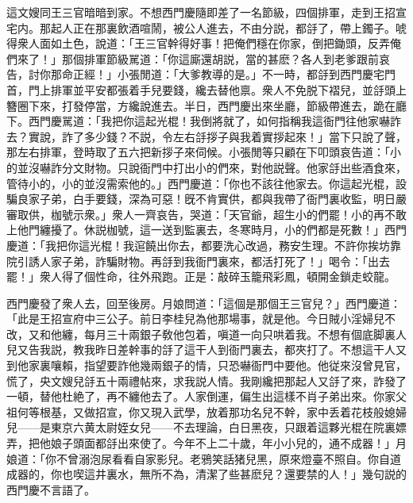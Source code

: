 這文嫂同王三官暗暗到家。不想西門慶隨即差了一名節級，四個排軍，走到王招宣宅内。那起人正在那裏飲酒喧鬧，被公人進去，不由分説，都㧱了，帶上鐲子。唬得衆人面如土色，說道：「王三官幹得好事！把俺們穩在你家，倒把鋤頭，反弄俺們來了！」那個排軍節級駡道：「你這廝還胡説，當的甚麽？各人到老爹跟前哀告，討你那命正經！」小張閒道：「大爹教導的是。」不一時，都㧱到西門慶宅門首，門上排軍並平安都張着手兒要錢，纔去替他禀。衆人不免脱下褶兒，並㧱頭上簪圈下來，打發停當，方纔說進去。半日，西門慶出來坐廳，節級帶進去，跪在廳下。西門慶駡道：「我把你這起光棍！我倒將就了，如何指稱我這衙門往他家嚇詐去？實說，詐了多少錢？不説，令左右㧱拶子與我着實拶起來！」當下只說了聲，那左右排軍，登時取了五六把新拶子來伺候。小張閒等只顧在下叩頭哀告道：「小的並沒嚇詐分文財物。只說衙門中打出小的們來，對他説聲。他家㧱出些酒食來，管待小的，小的並沒需索他的。」西門慶道：「你也不該往他家去。你這起光棍，設騙良家子弟，白手要錢，深為可惡！旣不肯實供，都與我帶了衙門裏收監，明日嚴審取供，枷號示衆。」衆人一齊哀告，哭道：「天官爺，超生小的們罷！小的再不敢上他門纏擾了。休説枷號，這一送到監裏去，冬寒時月，小的們都是死數！」西門慶道：「我把你這光棍！我逭饒出你去，都要洗心改過，務安生理。不許你挨坊靠院引誘人家子弟，詐騙財物。再㧱到我衙門裏來，都活打死了！」喝令：「出去罷！」衆人得了個性命，往外飛跑。正是：敲碎玉籠飛彩鳳，頓開金鎖走蛟龍。

西門慶發了衆人去，回至後房。月娘問道：「這個是那個王三官兒？」西門慶道：「此是王招宣府中三公子。前日李桂兒為他那場事，就是他。今日賊小淫婦兒不改，又和他纏，每月三十兩銀子敎他包着，嗔道一向只哄着我。不想有個底脚裏人兒又告我説，教我昨日差幹事的㧱了這干人到衙門裏去，都夾打了。不想這干人又到他家裏嚷賴，指望要詐他幾兩銀子的情，只恐嚇衙門中要他。他従來沒曾見官，慌了，央文嫂兒㧱五十兩禮帖來，求我説人情。我剛纔把那起人又㧱了來，詐發了一頓，替他杜絶了，再不纏他去了。人家倒運，偏生出這樣不肖子弟出來。你家父祖何等根基，又做招宣，你又現入武學，放着那功名兒不幹，家中丢着花枝般媳婦兒——是東京六黄太尉姪女兒——不去理論，白日黑夜，只跟着這夥光棍在院裏嫖弄，把他娘子頭面都㧱出來使了。今年不上二十歲，年小小兒的，通不成器！」月娘道：「你不曾溺泡尿看看自家影兒。老鴉笑話猪兒黑，原來燈臺不照自。你自道成器的，你也喫這井裏水，無所不為，清潔了些甚麽兒？還要禁的人！」幾句説的西門慶不言語了。

